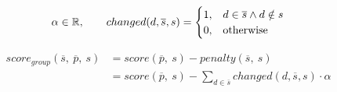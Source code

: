 \documentclass{article}
\begin{document}
\begin{equation}
    \notag \alpha \in \mathbb{R}, \qquad     changed(d,\overline{s}, s) = 
    \begin{cases}
      1, & d \in \overline{s} \land d \notin s \\
      0, & \text{otherwise}
    \end{cases}
\end{equation}

\begin{equation}
    \begin{split}
        score_{group}(\overline{s},\ \overline{p},\ s)
        & = score(\overline{p},\ s) - penalty(\overline{s},\ s) \\
        & = score(\overline{p},\ s) - \sum_{d \in \overline{s}} changed(d,\overline{s}, s) \cdot \alpha
    \end{split}
\end{equation}
\end{document}
